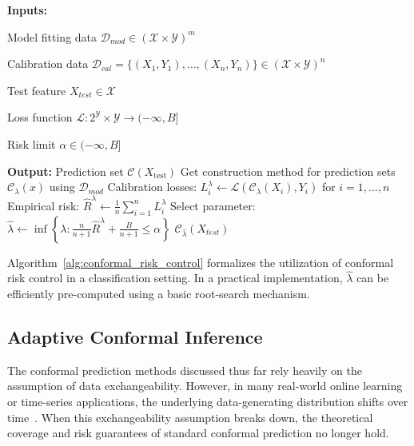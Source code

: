 \begin{algorithm}[t]
    \begin{algorithmic}[1]
        \vspace{1mm}
        \Statex \textbf{Inputs:}
        \Statex \hspace{\algorithmicindent}
        \begin{minipage}[t]{0.92\linewidth}
            Model fitting data
            $\mathcal{D}_{mod} \in (\mathcal{X} \times \mathcal{Y})^m$
            
            Calibration data
            $\mathcal{D}_{cal} = \{(X_1, Y_1), \dots, (X_n, Y_n)\}\in (\mathcal{X} \times \mathcal{Y})^n$
            
            Test feature
            $X_{test} \in \mathcal{X}$
            
            Loss function
            $\mathcal{L}: 2^{\mathcal{Y}} \times \mathcal{Y} \rightarrow (-\infty, B]$
            
            Risk limit
            $\alpha\in(-\infty, B]$
        \end{minipage}
        \vspace{1mm}
        \Statex \textbf{Output:}
        \Statex \hspace{\algorithmicindent}
        Prediction set $\mathcal C(X_{\mathrm{test}})$
        \Statex \hrulefill
        \State Get construction method for prediction sets $\mathcal{C}_\lambda(x)$ using $\mathcal{D}_{mod}$
        \For{$\lambda \in \Lambda$}
            \State Calibration losses: $L_i^\lambda \leftarrow \mathcal{L}(\mathcal{C}_\lambda(X_i),Y_i)$ for $i=1,\dots,n$
            \State Empirical risk: $\hat{R}^\lambda \leftarrow \frac{1}{n}\sum_{i=1}^{n}L_i^\lambda$
        \EndFor
        \State Select parameter: $\widehat{\lambda} \leftarrow \inf \left\{ \lambda : \frac{n}{n+1} \hat{R}^\lambda + \frac{B}{n+1} \leq \alpha \right\}$
        \State \Return $\mathcal{C}_{\hat{\lambda}}(X_{test})$
    \end{algorithmic}
    \caption{Conformal Risk Control for Classification}
    \label{alg:conformal_risk_control}
\end{algorithm}

Algorithm~\ref{alg:conformal_risk_control} formalizes the utilization of conformal risk control in a classification setting. In a practical implementation, $\widehat{\lambda}$ can be efficiently pre-computed using a basic root-search mechanism.

\subsection{Adaptive Conformal Inference}
\label{sect:adaptive_conformal_inference}
The conformal prediction methods discussed thus far rely heavily on the assumption of data exchangeability. However, in many real-world online learning or time-series applications, the underlying data-generating distribution shifts over time~\cite{Gibbs-AdaptiveConformalInference-2021, Zaffran-AdaptiveConformalPredictionsTimeSeries-2022, Feldman-RiskControlOnlineLearning-2023}. When this exchangeability assumption breaks down, the theoretical coverage and risk guarantees of standard conformal prediction no longer hold.


